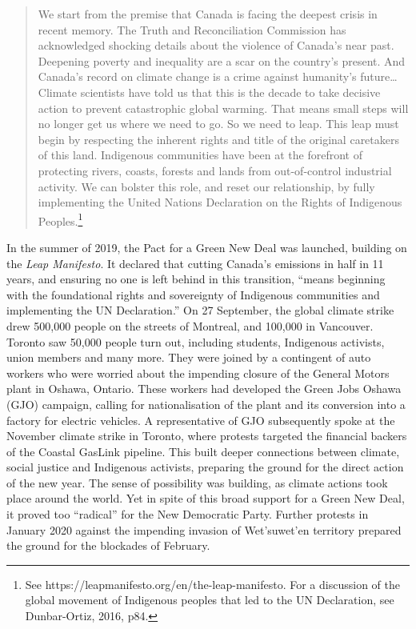 \blockquote{We start from the premise that Canada is facing the deepest crisis in recent memory. The Truth and Reconciliation Commission has acknowledged shocking details about the violence of Canada's near past. Deepening poverty and inequality are a scar on the country's present. And Canada's record on climate change is a crime against humanity's future\ldots Climate scientists have told us that this is the decade to take decisive action to prevent catastrophic global warming. That means small steps will no longer get us where we need to go. So we need to leap. This leap must begin by respecting the inherent rights and title of the original caretakers of this land. Indigenous communities have been at the forefront of protecting rivers, coasts, forests and lands from out-of-control industrial activity. We can bolster this role, and reset our relationship, by fully implementing the United Nations Declaration on the Rights of Indigenous Peoples.\footnote{See https://leapmanifesto.org/en/the-leap-manifesto. For a discussion of the global movement of Indigenous peoples that led to the UN Declaration, see Dunbar-Ortiz, 2016, p84.}}

In the summer of 2019, the Pact for a Green New Deal was launched, building on the \emph{Leap Manifesto}. It declared that cutting Canada's emissions in half in 11 years, and ensuring no one is left behind in this transition, ``means beginning with the foundational rights and sovereignty of Indigenous communities and implementing the UN Declaration.'' On 27 September, the global climate strike drew 500,000 people on the streets of Montreal, and 100,000 in Vancouver. Toronto saw 50,000 people turn out, including students, Indigenous activists, union members and many more. They were joined by a contingent of auto workers who were worried about the impending closure of the General Motors plant in Oshawa, Ontario. These workers had developed the Green Jobs Oshawa (GJO) campaign, calling for nationalisation of the plant and its conversion into a factory for electric vehicles. A representative of GJO subsequently spoke at the November climate strike in Toronto, where protests targeted the financial backers of the Coastal GasLink pipeline. This built deeper connections between climate, social justice and Indigenous activists, preparing the ground for the direct action of the new year. The sense of possibility was building, as climate actions took place around the world. Yet in spite of this broad support for a Green New Deal, it proved too ``radical'' for the New Democratic Party. Further protests in January 2020 against the impending invasion of Wet'suwet'en territory prepared the ground for the blockades of February.

